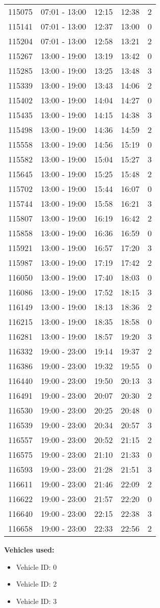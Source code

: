 \documentclass{article}
\begin{document}
\begin{tabular}{llccc}
115075 & 07:01 - 13:00 & 12:15 & 12:38 & 2 \\
115141 & 07:01 - 13:00 & 12:37 & 13:00 & 0 \\
115204 & 07:01 - 13:00 & 12:58 & 13:21 & 2 \\
115267 & 13:00 - 19:00 & 13:19 & 13:42 & 0 \\
115285 & 13:00 - 19:00 & 13:25 & 13:48 & 3 \\
115339 & 13:00 - 19:00 & 13:43 & 14:06 & 2 \\
115402 & 13:00 - 19:00 & 14:04 & 14:27 & 0 \\
115435 & 13:00 - 19:00 & 14:15 & 14:38 & 3 \\
115498 & 13:00 - 19:00 & 14:36 & 14:59 & 2 \\
115558 & 13:00 - 19:00 & 14:56 & 15:19 & 0 \\
115582 & 13:00 - 19:00 & 15:04 & 15:27 & 3 \\
115645 & 13:00 - 19:00 & 15:25 & 15:48 & 2 \\
115702 & 13:00 - 19:00 & 15:44 & 16:07 & 0 \\
115744 & 13:00 - 19:00 & 15:58 & 16:21 & 3 \\
115807 & 13:00 - 19:00 & 16:19 & 16:42 & 2 \\
115858 & 13:00 - 19:00 & 16:36 & 16:59 & 0 \\
115921 & 13:00 - 19:00 & 16:57 & 17:20 & 3 \\
115987 & 13:00 - 19:00 & 17:19 & 17:42 & 2 \\
116050 & 13:00 - 19:00 & 17:40 & 18:03 & 0 \\
116086 & 13:00 - 19:00 & 17:52 & 18:15 & 3 \\
116149 & 13:00 - 19:00 & 18:13 & 18:36 & 2 \\
116215 & 13:00 - 19:00 & 18:35 & 18:58 & 0 \\
116281 & 13:00 - 19:00 & 18:57 & 19:20 & 3 \\
116332 & 19:00 - 23:00 & 19:14 & 19:37 & 2 \\
116386 & 19:00 - 23:00 & 19:32 & 19:55 & 0 \\
116440 & 19:00 - 23:00 & 19:50 & 20:13 & 3 \\
116491 & 19:00 - 23:00 & 20:07 & 20:30 & 2 \\
116530 & 19:00 - 23:00 & 20:25 & 20:48 & 0 \\
116539 & 19:00 - 23:00 & 20:34 & 20:57 & 3 \\
116557 & 19:00 - 23:00 & 20:52 & 21:15 & 2 \\
116575 & 19:00 - 23:00 & 21:10 & 21:33 & 0 \\
116593 & 19:00 - 23:00 & 21:28 & 21:51 & 3 \\
116611 & 19:00 - 23:00 & 21:46 & 22:09 & 2 \\
116622 & 19:00 - 23:00 & 21:57 & 22:20 & 0 \\
116640 & 19:00 - 23:00 & 22:15 & 22:38 & 3 \\
116658 & 19:00 - 23:00 & 22:33 & 22:56 & 2 \\
\bottomrule
\end{tabular}

\textbf{Vehicles used:}
\begin{itemize}
  \item Vehicle ID: 0
  \item Vehicle ID: 2
  \item Vehicle ID: 3
\end{itemize}
\end{document}
